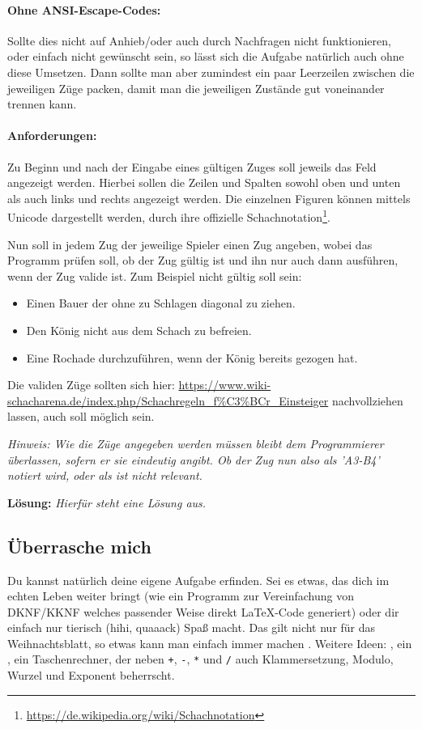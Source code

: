 \documentclass[table]{sopra-base}
\makeatletter
\let\T\texttt
\newenvironment{solution}{\null\par\noindent\textbf{\textcolor{sob@col@uulm@cs}{Lösung:}}\newline\bgroup\color{black}\slshape\ignorespaces}{\egroup}
\makeatother
\begin{document}
\paragraph{Ohne ANSI-Escape-Codes:}
Sollte dies nicht auf Anhieb/oder auch durch Nachfragen nicht funktionieren, oder einfach nicht gewünscht sein, so lässt sich die Aufgabe natürlich auch ohne diese Umsetzen.
Dann sollte man aber zumindest ein paar Leerzeilen zwischen die jeweiligen Züge packen,
damit man die jeweiligen Zustände gut voneinander trennen kann.

\paragraph{Anforderungen:}
Zu Beginn und nach der Eingabe eines gültigen Zuges soll jeweils das Feld angezeigt werden.
Hierbei sollen die Zeilen und Spalten sowohl oben und unten als auch links und rechts angezeigt werden. Die einzelnen Figuren können mittels Unicode dargestellt werden, durch ihre offizielle Schachnotation\footnote{\url{https://de.wikipedia.org/wiki/Schachnotation}}.\par{}

Nun soll in jedem Zug der jeweilige Spieler einen Zug angeben, wobei das Programm prüfen soll, ob der Zug gültig ist und ihn nur auch dann ausführen, wenn der Zug valide ist. Zum Beispiel nicht gültig soll sein: \begin{itemize}[nolistsep]
    \item Einen Bauer der ohne zu Schlagen diagonal zu ziehen.
    \item Den König nicht aus dem Schach zu befreien.
    \item Eine Rochade durchzuführen, wenn der König bereits gezogen hat.
\end{itemize}
Die validen Züge sollten sich hier: \url{https://www.wiki-schacharena.de/index.php/Schachregeln_f%C3%BCr_Einsteiger} nachvollziehen lassen, auch \say{en passant} soll möglich sein.\par{}
\textit{Hinweis: Wie die Züge angegeben werden müssen bleibt dem Programmierer überlassen,
sofern er sie eindeutig angibt. Ob der Zug nun also als 'A3-B4' notiert wird, oder als \say{\T{axb4}} ist nicht relevant.}

\begin{solution}
    Hierfür steht eine Lösung aus.
\end{solution}

\subsection{Überrasche mich}

Du kannst natürlich deine eigene Aufgabe erfinden. Sei es etwas, das dich im echten Leben weiter bringt (wie ein Programm zur Vereinfachung von DKNF/KKNF welches passender Weise direkt \LaTeX-Code generiert) oder dir einfach nur tierisch (hihi, quaaack) Spaß macht. Das gilt nicht nur für das Weihnachtsblatt, so etwas kann man einfach immer machen \Laughey. Weitere Ideen: , ein , ein Taschenrechner, der neben \T{+}, \T{-}, \T{*} und \T{/} auch Klammersetzung, Modulo, Wurzel und Exponent beherrscht.
\end{document}
